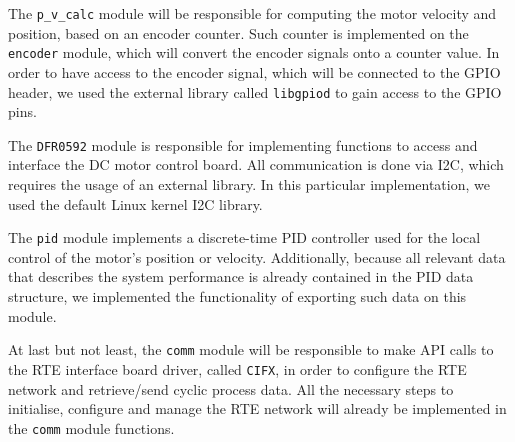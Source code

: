 The \verb|p_v_calc| module will be responsible for computing the motor velocity and position, based on an encoder counter.
Such counter is implemented on the \verb|encoder| module, which will convert the encoder signals onto a counter value.
In order to have access to the encoder signal, which will be connected to the GPIO header, we used the external library called \verb|libgpiod| to gain access to the GPIO pins.

The \verb|DFR0592| module is responsible for implementing functions to access and interface the DC motor control board.
All communication is done via I2C, which requires the usage of an external library.
In this particular implementation, we used the default Linux kernel I2C library.

The \verb|pid| module implements a discrete-time PID controller used for the local control of the motor's position or velocity.
Additionally, because all relevant data that describes the system performance is already contained in the PID data structure, we implemented the functionality of exporting such data on this module.

At last but not least, the \verb|comm| module will be responsible to make API calls to the RTE interface board driver, called \verb|CIFX|, in order to configure the RTE network and retrieve/send cyclic process data.
All the necessary steps to initialise, configure and manage the RTE network will already be implemented in the \verb|comm| module functions.
